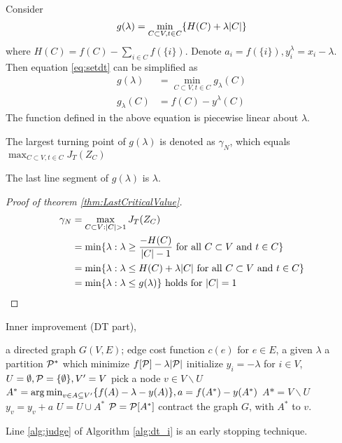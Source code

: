 \documentclass{article}
\begin{document}
Consider
\begin{equation}\label{eq:setdt}
g(\lambda) = \min_{C\subset V, t \in C} \{ H(C) + \lambda\abs{C}\}
\end{equation}
where $H(C) = f(C) - \sum_{i\in C} f(\{i\})$. Denote $a_i = f(\{i\}), y^{\lambda}_i = x_i - \lambda$. Then equation \ref{eq:setdt} can be simplified as 
\begin{align}\label{eq:setdt}
g(\lambda) &= \min_{C\subset V, t \in C} g_{\lambda}(C) \\
g_{\lambda}(C)  & = f(C) - y^{\lambda}(C)
\end{align}
The function defined in the above equation is piecewise linear about $\lambda$. 

\begin{theorem}\label{thm:LastCriticalValue}
The largest turning point of $g(\lambda)$ is denoted as $\gamma_N$, which equals $\max_{C\subset V, t\in C}J_T(Z_C)$
\end{theorem}

The last line segment of $g(\lambda)$ is $\lambda$.
\begin{proof}[Proof of theorem \ref{thm:LastCriticalValue}]
\begin{align*}
\gamma_N & = \max_{C\subset V: \abs{C}>1} J_T(Z_C) \\
& = \min\{\lambda : \lambda \geq \frac{-H(C)}{\abs{C}-1} \textrm{ for all $C\subset V$ and $ t\in C$}\} \\
& = \min\{\lambda : \lambda \leq H(C)+\lambda\abs{C} \textrm{ for all $C\subset V$ and $t \in C$}\} \\
& = \min\{\lambda : \lambda \leq g(\lambda) \} \textrm{ holds for } \abs{C}=1
\end{align*}
\end{proof}

Inner improvement (DT part),
\begin{algorithm}
\caption{}\label{alg:dt_i}
\begin{algorithmic}[1]
\REQUIRE a directed graph $G(V, E)$; edge cost function $c(e)$ for $e\in E$, a given $\lambda$
\ENSURE a partition $\P^*$ which minimize $f[\P] - \lambda \abs{\P}$
\STATE initialize $y_i = -\lambda$ for $ i \in V$, $U = \emptyset, \P = \{\emptyset\}, V' = V$
\STATE pick a node $v \in V\backslash U$
\STATE $A^* = \argmin_{v \in A \subseteq V'} \{ f(A) - \lambda - y(A)\}, a = f(A^*) - y(A^*)$
 \label{alg:judge}
\STATE $A* = V \backslash U$
\ENDIF
\STATE $y_v = y_v + a$
\STATE $U = U \cup A^*$
\STATE $\P= \P[A^*]$
\STATE contract the graph $G$, with $A^*$ to $v$.
\ENDWHILE
\end{algorithmic}
\end{algorithm}
Line \ref{alg:judge} of Algorithm \ref{alg:dt_i} is an early stopping technique.
\end{document}
